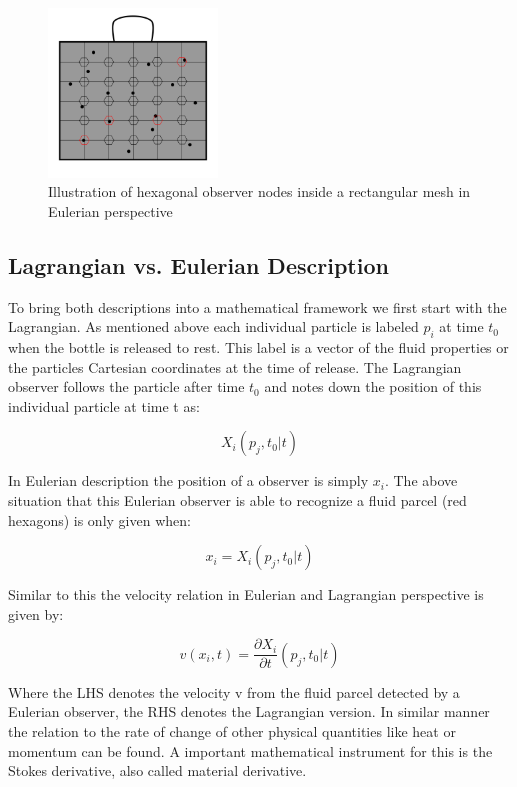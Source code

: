 \begin{figure}[htb]
\centering
\includegraphics[width=0.4\textwidth]{Figures/olive_oil_can_eulerian.pdf}
\caption{Illustration of hexagonal observer nodes inside a rectangular mesh in Eulerian perspective}
\label{fig:eulerian_bottle_observer}
\end{figure}


\subsection{Lagrangian vs. Eulerian Description}
To bring both descriptions into a mathematical framework we first start with the Lagrangian. As mentioned above each individual particle is labeled $p_{i}$ at time $t_{0}$ when the bottle is released to rest. This label is a vector of the fluid properties or the particles Cartesian coordinates at the time of release. The Lagrangian observer follows the particle after time $t_{0}$ and notes down the position of this individual particle at time t as:

\begin{equation}
X_{i}(p_{j}, t_{0} | t)
\end{equation}

In Eulerian description the position of a observer is simply $x_{i}$. The above situation that this Eulerian observer is able to recognize a fluid parcel (red hexagons) is only given when:

\begin{equation}
x_{i} = X_{i}(p_{j}, t_{0} | t)
\end{equation}

Similar to this the velocity relation in Eulerian and Lagrangian perspective is given by:

\begin{equation}
v(x_{i},t) = \frac{\partial X_{i}}{\partial t} (p_{j}, t_{0} | t)
\end{equation}

Where the LHS denotes the velocity v from the fluid parcel detected by a Eulerian observer, the RHS denotes the Lagrangian version. In similar manner the relation to the rate of change of other physical quantities like heat or momentum can be found. A important mathematical instrument for this is the Stokes derivative, also called material derivative.


